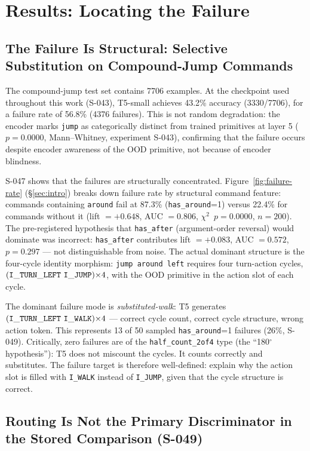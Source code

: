 \section{Results: Locating the Failure}
\label{sec:locating}

\subsection{The Failure Is Structural: Selective Substitution on Compound-Jump Commands}

The compound-jump test set contains 7706 examples. At the checkpoint used throughout
this work (S-043), T5-small achieves 43.2\% accuracy (3330/7706), for a failure rate
of 56.8\% (4376 failures). This is not random degradation: the encoder marks
\texttt{jump} as categorically distinct from trained primitives at layer 5
($p = 0.0000$, Mann--Whitney, experiment S-043), confirming that the failure occurs
despite encoder awareness of the OOD primitive, not because of encoder blindness.

S-047 shows that the failures are structurally concentrated.
Figure~\ref{fig:failure-rate} (\S\ref{sec:intro}) breaks down failure rate by structural
command feature: commands containing \texttt{around} fail at 87.3\%
(\texttt{has\_around}=1) versus 22.4\% for commands without it (lift $= +0.648$,
AUC $= 0.806$, $\chi^2$~$p = 0.0000$, $n = 200$).
The pre-registered hypothesis that \texttt{has\_after} (argument-order reversal) would
dominate was incorrect: \texttt{has\_after} contributes lift $= +0.083$, AUC $= 0.572$,
$p = 0.297$ --- not distinguishable from noise.
The actual dominant structure is the four-cycle identity morphism:
\texttt{jump around left} requires four turn-action cycles,
$({\tt I\_TURN\_LEFT}\ {\tt I\_JUMP}){\times}4$,
with the OOD primitive in the action slot of each cycle.

The dominant failure mode is \emph{substituted-walk}: T5 generates
$({\tt I\_TURN\_LEFT}\ {\tt I\_WALK}){\times}4$ --- correct cycle count, correct cycle
structure, wrong action token.
This represents 13 of 50 sampled \texttt{has\_around}=1 failures (26\%, S-049).
Critically, zero failures are of the \texttt{half\_count\_2of4} type (the ``180$^\circ$
hypothesis''): T5 does not miscount the cycles. It counts correctly and substitutes.
The failure target is therefore well-defined: explain why the action slot is filled with
\texttt{I\_WALK} instead of \texttt{I\_JUMP}, given that the cycle structure is correct.

\subsection{Routing Is Not the Primary Discriminator in the Stored Comparison (S-049)}

